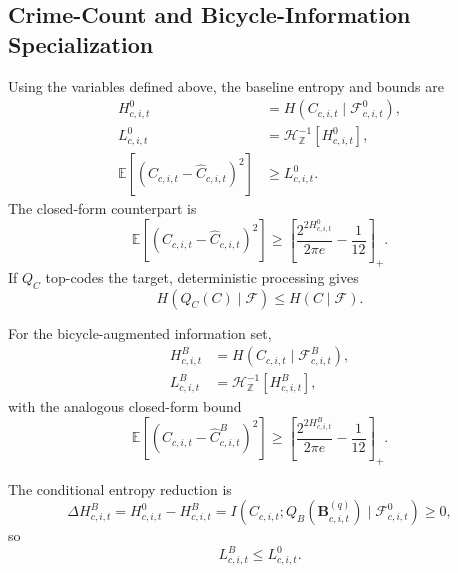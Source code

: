 \documentclass[applsci,article,accept,moreauthors]{Definitions/mdpi}
\begin{document}
\subsection{Crime-Count and Bicycle-Information Specialization}
\label{subsec:theory_application_appendix}

Using the variables defined above, the baseline entropy and bounds are
\begin{align}
H^0_{c,i,t}
&=H(C_{c,i,t}\mid\mathcal F^0_{c,i,t}),
\label{eq:crime_baseline_entropy}\\
L^0_{c,i,t}
&=\mathcal H_{\mathbb Z}^{-1}[H^0_{c,i,t}],
\label{eq:local_bound_baseline}\\
\mathbb E[(C_{c,i,t}-\widehat C_{c,i,t})^2]
&\geq L^0_{c,i,t}.
\label{eq:crime_baseline_exact_bound}
\end{align}
The closed-form counterpart is
\begin{equation}
\mathbb E[(C_{c,i,t}-\widehat C_{c,i,t})^2]
\geq
\left[\frac{2^{2H^0_{c,i,t}}}{2\pi e}-\frac1{12}\right]_+ .
\label{eq:crime_baseline_closed_bound}
\end{equation}
If \(Q_C\) top-codes the target, deterministic processing gives
\begin{equation}
H(Q_C(C)\mid\mathcal F)\leq H(C\mid\mathcal F).
\label{eq:top_coded_entropy_order}
\end{equation}

For the bicycle-augmented information set,
\begin{align}
H^B_{c,i,t}
&=H(C_{c,i,t}\mid\mathcal F^B_{c,i,t}),
\label{eq:crime_bicycle_entropy}\\
L^B_{c,i,t}
&=\mathcal H_{\mathbb Z}^{-1}[H^B_{c,i,t}],
\label{eq:local_bound_bike}
\end{align}
with the analogous closed-form bound
\begin{equation}
\mathbb E[(C_{c,i,t}-\widehat C^B_{c,i,t})^2]
\geq
\left[\frac{2^{2H^B_{c,i,t}}}{2\pi e}-\frac1{12}\right]_+ .
\label{eq:crime_bicycle_closed_bound}
\end{equation}

\begin{Proposition}
\label{prop:bicycle_information_value}
The conditional entropy reduction is
\begin{equation}
\Delta H^B_{c,i,t}
=H^0_{c,i,t}-H^B_{c,i,t}
=I(C_{c,i,t};Q_B(\mathbf B^{(q)}_{c,i,t})
\mid\mathcal F^0_{c,i,t})\geq0,
\label{eq:bicycle_information_gain}
\end{equation}
so
\begin{equation}
L^B_{c,i,t}\leq L^0_{c,i,t}.
\label{eq:bicycle_exact_bound_order}
\end{equation}
\end{Proposition}
\end{document}
